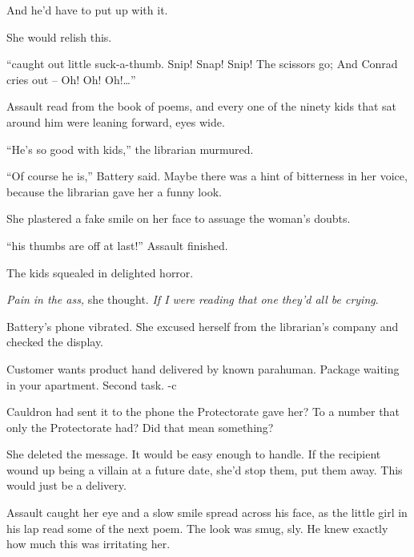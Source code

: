 And he'd have to put up with it.



She would relish this.



\blacksquare



``\ldotsAnd caught out little suck-a-thumb.
Snip!  Snap!  Snip!  The scissors go;
And Conrad cries out – Oh! Oh! Oh!\ldots''



Assault read from the book of poems, and every one of the ninety kids that sat around him were leaning forward, eyes wide.



``He's so good with kids,'' the librarian murmured.



``Of course he is,'' Battery said.  Maybe there was a hint of bitterness in her voice, because the librarian gave her a funny look.



She plastered a fake smile on her face to assuage the woman's doubts.



``\ldotsboth his thumbs are off at last!''  Assault finished.



The kids squealed in delighted horror.



\emph{Pain in the ass, }she thought.  \emph{If I were reading that one they'd all be crying}.



Battery's phone vibrated.  She excused herself from the librarian's company and checked the display.



Customer wants product hand delivered by known parahuman.  Package waiting in your apartment.  Second task.  -c



Cauldron had sent it to the phone the Protectorate gave her?  To a number that only the Protectorate had?  Did that mean something?



She deleted the message.  It would be easy enough to handle.  If the recipient wound up being a villain at a future date, she'd stop them, put them away.  This would just be a delivery.



Assault caught her eye and a slow smile spread across his face, as the little girl in his lap read some of the next poem.  The look was smug, sly.  He knew exactly how much this was irritating her.



